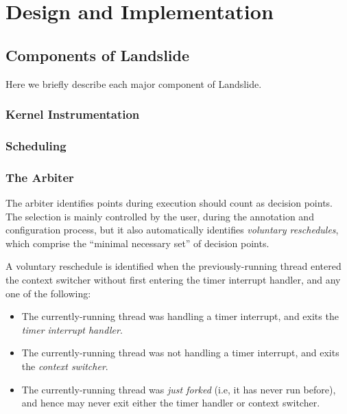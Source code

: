 \section{Design and Implementation}
\subsection{Components of Landslide}

Here we briefly describe each major component of Landslide. %

\subsubsection{Kernel Instrumentation}

\subsubsection{Scheduling}


\subsubsection{The Arbiter}

The arbiter identifies points during execution should count as decision points. The selection is mainly controlled by the user, during the annotation and configuration process, but it also automatically identifies {\em voluntary reschedules}, which comprise the ``minimal necessary set'' of decision points.

A voluntary reschedule is identified when the previously-running thread entered the context switcher without first entering the timer interrupt handler, and any one of the following:
\begin{itemize}
	\item The currently-running thread was handling a timer interrupt, and exits the {\em timer interrupt handler}.
	\item The currently-running thread was not handling a timer interrupt, and exits the {\em context switcher}.
	\item The currently-running thread was {\em just forked} (i.e, it has never run before), and hence may never exit either the timer handler or context switcher.
\end{itemize}

